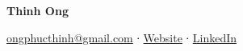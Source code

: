 \begin{huge}\begin{center}{\bf Thinh Ong}\end{center}\end{huge}
\begin{center}\href{mailto::ongphucthinh@gmail.com}{ongphucthinh@gmail.com} ∙ \href{https://drthinhong.com/}{Website} ∙ \href{https://www.linkedin.com/in/thinh-ong/}{LinkedIn}
\end{center}
\vspace{5pt}

\renewcommand{\arraystretch}{1.3}